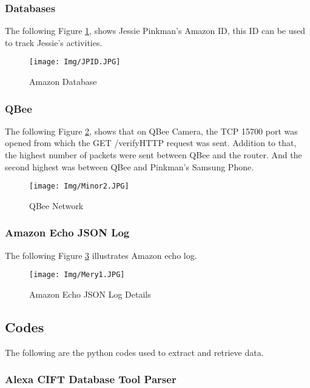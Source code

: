 \documentclass{easychair}
\begin{document}
\subsubsection{Databases}
The following Figure \ref{fig:Amazon Database}, shows Jessie Pinkman's Amazon ID, this ID can be used to track Jessie's activities.
\begin{figure}[h]
    \centering
    \texttt{[image: Img/JPID.JPG]}
    \caption{Amazon Database}
    \label{fig:Amazon Database}
\end{figure}
\newpage
\subsubsection{QBee}
The following Figure \ref{fig:QBee Network}, shows that on QBee Camera, the TCP 15700 port was opened from which the GET /verifyHTTP request was sent. Addition to that, the highest number of packets were sent between QBee and the router. And the second highest was between QBee and Pinkman’s Samsung Phone.
\begin{figure}[h]
    \centering
    \texttt{[image: Img/Minor2.JPG]}
    \caption{QBee Network}
    \label{fig:QBee Network}
\end{figure}
\newpage
\subsubsection{Amazon Echo JSON Log}
The following Figure \ref{fig:Amazon Echo JSON Log Details} illustrates Amazon echo log.
\begin{figure}[h]
    \centering
    \texttt{[image: Img/Mery1.JPG]}
    \caption{Amazon Echo JSON Log Details}
    \label{fig:Amazon Echo JSON Log Details}
\end{figure}
\newpage




\subsection{Codes}
The following are the python codes used to extract and retrieve data.
\subsubsection{Alexa CIFT Database Tool Parser}
\end{document}
